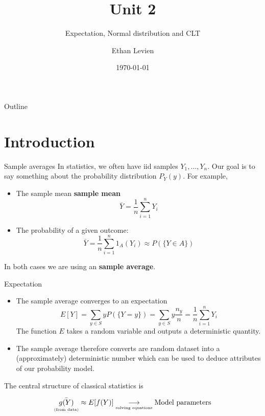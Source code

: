 

 \title{Unit 2}
 \subtitle{Expectation, Normal distribution and CLT}
 \author{Ethan Levien}
 \date{\today}





\begin{frame}
  \titlepage
\end{frame}

\begin{frame}{Outline}
  \tableofcontents
\end{frame}

\section{Introduction}
\begin{frame}{Sample averages}
In statistics, we often have iid samples $Y_1,\dots,Y_n$. Our goal is to say something about the probability distribution $P_Y(y)$. For example, 
\begin{itemize}
\item The sample mean {\bf sample mean}
\begin{equation*}
\bar{Y} = \frac{1}{n}\sum_{i=1}^n Y_i
\end{equation*} 
\item The probability of a given outcome: 
\begin{equation*}
\bar{Y} = \frac{1}{n}\sum_{i=1}^n 1_A(Y_i) \approx P(\{Y \in A\})
\end{equation*}
\end{itemize}
In both cases we are using an {\bf sample average}. 
\end{frame}


\begin{frame}{Expectation}
\begin{itemize}
\item The sample average converges to an expectation 
\begin{equation*}
E[Y] = \sum_{y \in S}yP(\{Y = y\}) = \sum_{y \in S}y\frac{n_y}{n} = \frac{1}{n}\sum_{i=1}^nY_i
\end{equation*}
The function $E$ takes a random variable and outputs a deterministic quantity. 
\item The sample average therefore converts are random dataset into a (approximately) deterministic number which can be used to deduce attributes of our probability model. 
\end{itemize}

The central structure of classical statistics is
\begin{center}
\begin{equation*}
 \underset{\text{\tiny (from data)}}{\bar{g(Y)}} \approx \underset{}{E[f(Y)]} \underset{\text{\tiny solving equations}}{\longrightarrow} \text{Model parameters}
\end{equation*}
\end{center}


\end{frame}


